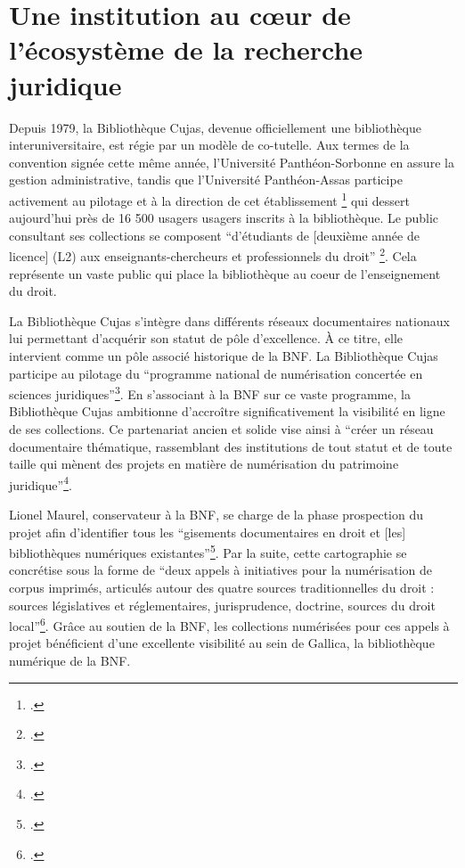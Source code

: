 \section[Une institution juridique]{Une institution au cœur de l’écosystème de la recherche juridique}

Depuis 1979, la Bibliothèque Cujas, devenue officiellement une bibliothèque interuniversitaire, est régie par un modèle de co-tutelle. Aux termes de la convention signée cette même année, l'Université Panthéon-Sorbonne en assure la gestion administrative, tandis que l'Université Panthéon-Assas participe activement au pilotage et à la direction de cet établissement \footcite{lobetCujasTraditionModernite2002} qui dessert aujourd'hui près de 16 500 usagers usagers inscrits à la bibliothèque. Le public consultant ses collections se composent \enquote{d'étudiants de [deuxième année de licence] (L2) aux enseignants-chercheurs et professionnels du droit} \footcite{BibliothequeInteruniversitaireCujas}. Cela représente un vaste public qui place la bibliothèque au coeur de l'enseignement du droit.

La Bibliothèque Cujas s'intègre dans différents réseaux documentaires nationaux lui permettant d'acquérir son statut de pôle d'excellence. À ce titre, elle intervient comme un pôle associé historique de la \ac{BNF}. La Bibliothèque Cujas participe au pilotage du \enquote{programme national de numérisation concertée en sciences juridiques}\footcite{Arabesques_69_12_dossier_balleypdfEspaceTravail}. En s'associant à la \ac{BNF} sur ce vaste programme, la Bibliothèque Cujas ambitionne d'accroître significativement la visibilité en ligne de ses collections. Ce partenariat ancien et solide vise ainsi à \enquote{créer un réseau documentaire thématique, rassemblant des institutions de tout statut et de toute taille qui mènent des projets en matière de numérisation du patrimoine juridique}\footcite{ProgrammeNationalNumerisation}. 

Lionel Maurel, conservateur à la \ac{BNF}, se charge de la phase prospection du projet afin d'identifier tous les \enquote{gisements documentaires en droit et [les] bibliothèques numériques existantes}\footcite{Arabesques_69_12_dossier_balleypdfEspaceTravail}. Par la suite, cette cartographie se concrétise sous la forme de \enquote{deux appels à initiatives pour la numérisation de corpus imprimés, articulés autour des quatre sources traditionnelles du droit : sources législatives et réglementaires, jurisprudence, doctrine, sources du droit local}\footcite{ProgrammeNationalNumerisation}. Grâce au soutien de la \ac{BNF}, les collections numérisées pour ces appels à projet bénéficient d'une excellente visibilité au sein de Gallica, la bibliothèque numérique de la \ac{BNF}. 

